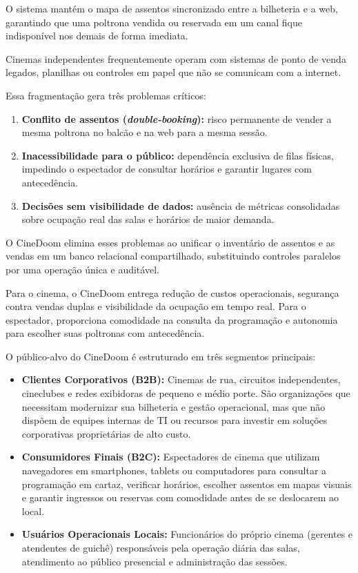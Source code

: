 O sistema mantém o mapa de assentos sincronizado entre a bilheteria e a web, garantindo que uma poltrona vendida ou reservada em um canal fique indisponível nos demais de forma imediata.


Cinemas independentes frequentemente operam com sistemas de ponto de venda legados, planilhas ou controles em papel que não se comunicam com a internet. 

Essa fragmentação gera três problemas críticos:
\begin{enumerate}
\tightlist
\item \textbf{Conflito de assentos (\emph{double-booking}):} risco permanente de vender a mesma poltrona no balcão e na web para a mesma sessão.
\item \textbf{Inacessibilidade para o público:} dependência exclusiva de filas físicas, impedindo o espectador de consultar horários e garantir lugares com antecedência.
\item \textbf{Decisões sem visibilidade de dados:} ausência de métricas consolidadas sobre ocupação real das salas e horários de maior demanda.
\end{enumerate}

O CineDoom elimina esses problemas ao unificar o inventário de assentos e as vendas em um banco relacional compartilhado, substituindo controles paralelos por uma operação única e auditável.


Para o cinema, o CineDoom entrega redução de custos operacionais, segurança contra vendas duplas e visibilidade da ocupação em tempo real. Para o espectador, proporciona comodidade na consulta da programação e autonomia para escolher suas poltronas com antecedência.


O público-alvo do CineDoom é estruturado em três segmentos principais:

\begin{itemize}
\tightlist
\item \textbf{Clientes Corporativos (B2B):} Cinemas de rua, circuitos independentes, cineclubes e redes exibidoras de pequeno e médio porte. São organizações que necessitam modernizar sua bilheteria e gestão operacional, mas que não dispõem de equipes internas de TI ou recursos para investir em soluções corporativas proprietárias de alto custo.
\item \textbf{Consumidores Finais (B2C):} Espectadores de cinema que utilizam navegadores em smartphones, tablets ou computadores para consultar a programação em cartaz, verificar horários, escolher assentos em mapas visuais e garantir ingressos ou reservas com comodidade antes de se deslocarem ao local.
\item \textbf{Usuários Operacionais Locais:} Funcionários do próprio cinema (gerentes e atendentes de guichê) responsáveis pela operação diária das salas, atendimento ao público presencial e administração das sessões.
\end{itemize}

